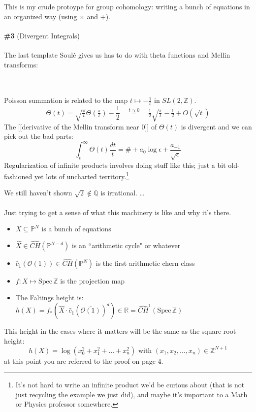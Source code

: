 \documentclass[12pt]{article}
\begin{document}
This is my crude protoype for group cohomology: writing a bunch of equations in an organized way (using $\times$ and $+$). \\ \\
\textbf{\#3} (Divergent Integrals) \\ \\
The last template Soul\'{e} gives us has to do with theta functions and Mellin transforms: \\ \\
 \\ 
Poisson summation is related to the map $t \mapsto - \frac{1}{t}$ in $SL(2, \mathbb{Z})$. 
$$ \Theta(t) = \sqrt{\tfrac{\pi}{t}} \Theta(\tfrac{\pi}{t})  - \frac{1}{2} 
 \quad\stackrel{t\approx 0}{=}\quad \tfrac{1}{2}\sqrt{\tfrac{\pi}{t}} - \tfrac{1}{2}   + O(\sqrt{t})$$
The [[derivative of the Mellin transform near $0$]] of $\Theta(t)$ is divergent and we can pick out the bad parts:
$$ \int_\epsilon^\infty \Theta(t)  \frac{dt}{t}
 = \# + a_0 \log \epsilon + \frac{a_{-1}}{\sqrt{\epsilon}} $$
 Regularization of infinite products involves doing stuff like this; just a bit old-fashioned yet lots of uncharted territory.\footnote{It's not hard to write an infinite product we'd be curious about (that is not just recycling the example we just did), and maybe it's important to a Math or Physics professor somewhere.}

\newpage

\noindent We still haven't shown $\sqrt{2} \notin \mathbb{Q}$ is irrational. \dots \\ \\
Just trying to get a sense of what this machinery is like and why it's there.  
\begin{itemize}
\item $X \subseteq \mathbb{P}^N$ is a bunch of equations
\item $\hat{X} \in \widehat{CH}(\mathbb{P}^{N-d}) $ is an ``arithmetic cycle" or whatever
\item $\hat{c}_1(\mathcal{O}(1))\in \widehat{CH}(\mathbb{P}^N) $ is the first arithmetic chern class 
\item $f : X \mapsto \mathrm{Spec}\, \mathbb{Z}$ is the projection map
\item The Faltings height is: $ h(X) = f_\ast (\hat{X} \cdot \hat{c}_1(\overline{\mathcal{O}(1)})^d) \in \mathbb{R} = \widehat{CH}^1(\mathrm{Spec}\, \mathbb{Z})$
\end{itemize}
This height in the cases where it matters will be the same as the square-root height:
$$ h(X) = \log (x_0^2 + x_1^2 + \dots + x_n^2)  \text{ with } (x_1, x_2, \dots, x_n) \in \mathbb{Z}^{N+1} $$
at this point you are referred to the proof on page {\color{blue} 4}.
\end{document}
